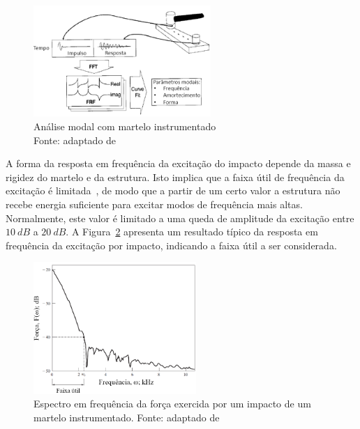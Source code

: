 \begin{figure}[h]
	\centering 
 	\includegraphics[width=0.60\textwidth]{figs/impact_testing}
 	\caption[Análise modal com martelo instrumentado]{Análise modal com martelo
 	instrumentado \\
 	Fonte: adaptado de \cite{schwarz1999experimental}}
 	\label{fig::impact_testing}
\end{figure}

A forma da resposta em frequência da excitação do impacto depende da massa e
rigidez do martelo e da estrutura. Isto implica que a faixa útil de frequência
da excitação é limitada~\cite{rao2011mechanical}, de modo que a partir de um
certo valor a estrutura não recebe energia suficiente para excitar modos de
frequência mais altas. Normalmente, este valor é limitado a uma queda de
amplitude da excitação entre $10~dB$ a $20~dB$. A Figura~\ref{fig::range_hammer}
apresenta um resultado típico da resposta em frequência da excitação por
impacto, indicando a faixa útil a ser considerada.

\begin{figure}[h]
	\centering 
 	\includegraphics[width=0.55\textwidth]{figs/range_hammer}
 	\caption[Espectro em frequência da força exercida por um impacto de um martelo
 	instrumentado]{Espectro em frequência da força exercida por um impacto de um martelo
 	instrumentado. Fonte: adaptado de \cite{rao2011mechanical}}
 	\label{fig::range_hammer}
\end{figure}

